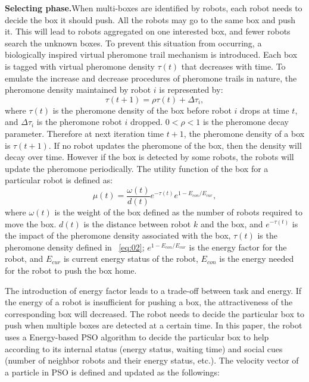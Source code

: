 \documentclass[journal]{IEEEtran}
\begin{document}
\textbf{Selecting phase.}When multi-boxes are identified by robots, each robot needs to decide the box it should push. All the robots may go to the same box and push it. This will lead to robots aggregated on one interested box, and fewer robots search the unknown boxes. To prevent this situation from occurring, a biologically inspired virtual pheromone trail mechanism is introduced. Each box is tagged with virtual pheromone density $\tau(t)$ that decreases with time. To emulate the increase and decrease procedures of pheromone trails in nature, the pheromone density maintained by robot $i$ is represented by:
%
\begin{equation}
\tau(t+1) = \rho\tau(t) + \Delta\tau_i,
\label{eq:02}
\end{equation}
%
where $\tau(t)$ is the pheromone density of the box before robot $i$ drops at time $t$, and $\Delta\tau_i$ is the pheromone robot $i$ dropped. $0<\rho<1$ is the pheromone decay parameter. Therefore at next iteration time $t+1$, the pheromone density of a box is $\tau(t+1)$.
If no robot updates the pheromone of the box, then the density will decay over time. However if the box is detected by some robots, the robots will update the pheromone periodically. The utility function of the box for a particular robot is defined as:
%
\begin{equation}
\mu(t) = \frac{\omega(t)}{d(t)}e^{-\tau(t)}e^{1-E_{con}/E_{cur}},
\label{eq:03}
\end{equation}
%
where $\omega(t)$ is the weight of the box defined as the number of robots required to move the box. $d(t)$ is the distance between robot $k$ and the box, and $e^{-\tau(t)}$ is the impact of the pheromone density associated with the box, $\tau(t)$ is the pheromone density defined in ~\ref{eq:02}; $e^{1-E_{con}/E_{cur}}$ is the energy factor for the robot, and $E_{cur}$ is current energy status of the robot, $E_{con}$ is the energy needed for the robot to push the box home.

The introduction of energy factor leads to a trade-off between task and energy. If the energy of a robot is insufficient for pushing a box, the attractiveness of the corresponding box will decreased. The robot needs to decide the particular box to push when multiple boxes are detected at a certain time. In this paper, the robot uses a Energy-based PSO algorithm to decide the particular box to help according to its internal status (energy status, waiting time) and social cues (number of neighbor robots and their energy status, etc.). The velocity vector of a particle in PSO is defined and updated as the followings:
\end{document}
